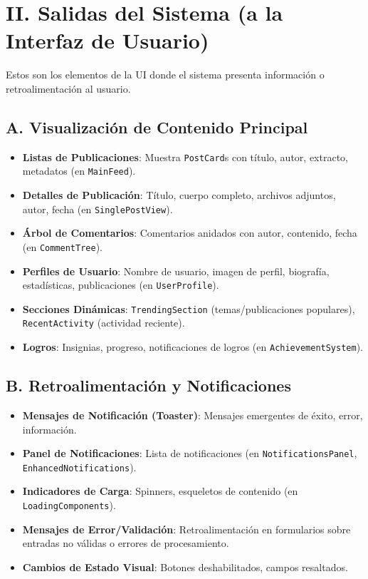 \documentclass{article}
\begin{document}
\section*{II. Salidas del Sistema (a la Interfaz de Usuario)}
Estos son los elementos de la UI donde el sistema presenta información o retroalimentación al usuario.

\subsection*{A. Visualización de Contenido Principal}
\begin{itemize}
    \item \textbf{Listas de Publicaciones}: Muestra \texttt{PostCard}s con título, autor, extracto, metadatos (en \texttt{MainFeed}).
    \item \textbf{Detalles de Publicación}: Título, cuerpo completo, archivos adjuntos, autor, fecha (en \texttt{SinglePostView}).
    \item \textbf{Árbol de Comentarios}: Comentarios anidados con autor, contenido, fecha (en \texttt{CommentTree}).
    \item \textbf{Perfiles de Usuario}: Nombre de usuario, imagen de perfil, biografía, estadísticas, publicaciones (en \texttt{UserProfile}).
    \item \textbf{Secciones Dinámicas}: \texttt{TrendingSection} (temas/publicaciones populares), \texttt{RecentActivity} (actividad reciente).
    \item \textbf{Logros}: Insignias, progreso, notificaciones de logros (en \texttt{AchievementSystem}).
\end{itemize}

\subsection*{B. Retroalimentación y Notificaciones}
\begin{itemize}
    \item \textbf{Mensajes de Notificación (Toaster)}: Mensajes emergentes de éxito, error, información.
    \item \textbf{Panel de Notificaciones}: Lista de notificaciones (en \texttt{NotificationsPanel}, \texttt{EnhancedNotifications}).
    \item \textbf{Indicadores de Carga}: Spinners, esqueletos de contenido (en \texttt{LoadingComponents}).
    \item \textbf{Mensajes de Error/Validación}: Retroalimentación en formularios sobre entradas no válidas o errores de procesamiento.
    \item \textbf{Cambios de Estado Visual}: Botones deshabilitados, campos resaltados.
\end{itemize}
\end{document}
